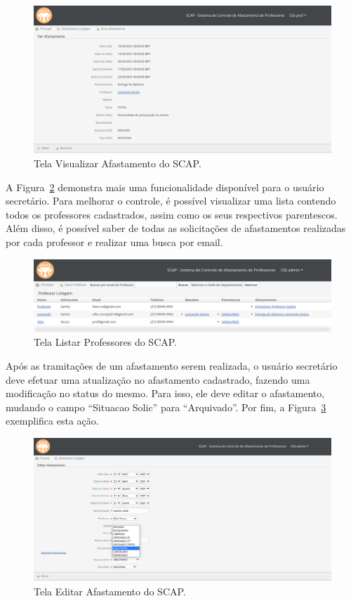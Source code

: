 \begin{figure}[!h]
	\centering
	\includegraphics[scale=0.33]{figuras/fig-projeto-ver-afastamento} 
	\caption{Tela Visualizar Afastamento do SCAP.}
	\label{fig-projeto-ver-afastamento}
\end{figure}

A Figura~\ref{fig-projeto-listar-professores} demonstra mais uma funcionalidade disponível para o usuário secretário. Para melhorar o controle, é possível visualizar uma lista contendo todos os professores cadastrados, assim como os seus respectivos parentescos. Além disso, é possível saber de todas as solicitações de afastamentos realizadas por cada professor e realizar uma busca por email.  

\begin{figure}[!h]
	\centering
	\includegraphics[scale=0.33]{figuras/fig-projeto-listar-professores} 
	\caption{Tela Listar Professores do SCAP.}
	\label{fig-projeto-listar-professores}
\end{figure}

Após as tramitações de um afastamento serem realizada, o usuário secretário deve efetuar uma atualização no afastamento cadastrado, fazendo uma modificação no status do mesmo. Para isso, ele deve editar o afastamento, mudando o campo ``Situacao Solic'' para ``Arquivado''. Por fim, a Figura~\ref{fig-projeto-editar-afastamento} exemplifica esta ação.

\begin{figure}[!h]
	\centering
	\includegraphics[scale=0.33]{figuras/fig-projeto-editar-afastamento} 
	\caption{Tela Editar Afastamento do SCAP.}
	\label{fig-projeto-editar-afastamento}
\end{figure}
